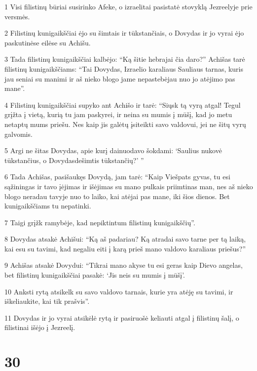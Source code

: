 \par 1 Visi filistinų būriai susirinko Afeke, o izraelitai pasistatė stovyklą Jezreelyje prie versmės. 
\par 2 Filistinų kunigaikščiai ėjo su šimtais ir tūkstančiais, o Dovydas ir jo vyrai ėjo paskutinėse eilėse su Achišu. 
\par 3 Tada filistinų kunigaikščiai kalbėjo: “Ką šitie hebrajai čia daro?” Achišas tarė filistinų kunigaikščiams: “Tai Dovydas, Izraelio karaliaus Sauliaus tarnas, kuris jau seniai su manimi ir aš nieko blogo jame nepastebėjau nuo jo atėjimo pas mane”. 
\par 4 Filistinų kunigaikščiai supyko ant Achišo ir tarė: “Siųsk tą vyrą atgal! Tegul grįžta į vietą, kurią tu jam paskyrei, ir neina su mumis į mūšį, kad jo metu netaptų mums priešu. Nes kaip jis galėtų įsiteikti savo valdovui, jei ne šitų vyrų galvomis. 
\par 5 Argi ne šitas Dovydas, apie kurį dainuodavo šokdami: ‘Saulius nukovė tūkstančius, o Dovydas­dešimtis tūkstančių?’ ” 
\par 6 Tada Achišas, pasišaukęs Dovydą, jam tarė: “Kaip Viešpats gyvas, tu esi sąžiningas ir tavo įėjimas ir išėjimas su mano pulkais priimtinas man, nes aš nieko blogo neradau tavyje nuo to laiko, kai atėjai pas mane, iki šios dienos. Bet kunigaikščiams tu nepatinki. 
\par 7 Taigi grįžk ramybėje, kad nepiktintum filistinų kunigaikščių”. 
\par 8 Dovydas atsakė Achišui: “Ką aš padariau? Ką atradai savo tarne per tą laiką, kai esu su tavimi, kad negaliu eiti į karą prieš mano valdovo karaliaus priešus?” 
\par 9 Achišas atsakė Dovydui: “Tikrai mano akyse tu esi geras kaip Dievo angelas, bet filistinų kunigaikščiai pasakė: ‘Jis neis su mumis į mūšį’. 
\par 10 Anksti rytą atsikelk su savo valdovo tarnais, kurie yra atėję su tavimi, ir iškeliaukite, kai tik prašvis”. 
\par 11 Dovydas ir jo vyrai atsikėlė rytą ir pasiruošė keliauti atgal į filistinų šalį, o filistinai išėjo į Jezreelį.



\chapter{30}

